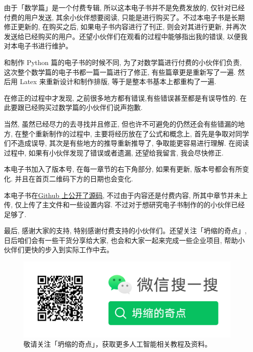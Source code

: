 由于「数学篇」是一个付费专辑, 所以这本电子书并不是免费发放的, 仅针对已经付费的用户发送, 其余小伙伴想要阅读, 只能是进行购买了。不过本电子书是长期修正更新的, 在购买之后, 如果电子书内容进行了刊正, 则会对其进行更新, 并再次发送给已经购买的用户。还望小伙伴们在观看的过程中能够指出我的错误, 以便我对本电子书进行维护。

和制作 Python 篇的电子书的时候不同, 为了对数学篇进行付费的小伙伴们负责, 这次整个数学篇的电子书都一篇一篇进行了修正, 有些篇章更是重新写了一遍. 然后用 Latex 来重新设计和制作排版, 等于是整本书基本上都重构了一遍.

在修正的过程中才发现, 之前很多地方都有错误,有些错误甚至都是有误导性的. 在此要跟已经购买过数学篇的小伙伴们说声抱歉. 

当然, 虽然已经尽力的去寻找并且修正, 但也许不可避免的仍然还会有些错漏的地方, 在整个重新制作的过程中, 主要将经历放在了公式和概念上, 首先是争取对同学们不造成误导, 其次是有些地方的推导重新推导了, 争取能更容易进行理解. 在阅读过程中, 如果有小伙伴发现了错误或者遗漏, 还望给我留言, 我会尽快修正.

本电子书加入了版本号, 在每一章节的右下角部分, 如果有更新, 版本号都会有所变化. 并且在首页二维码下方的日期也会变化.

本电子书在\href{https://github.com/hivandu/Ebook_AI_Math}{Github 上公开了源码}, 不过由于内容还是付费内容, 所其中章节并未上传, 仅上传了主文件和一些设置内容. 不过对于想研究电子书制作的的小伙伴已经足够了.

最后, 感谢大家的支持, 特别感谢付费支持的小伙伴们。还望关注「坍缩的奇点」, 日后咱们会有一些干货分享给大家, 也会和大家一起来完成一些企业项目, 帮助小伙伴们更快的步入到实际工作中去。

\begin{figure}[ht]
  \centering
  \includegraphics[width=0.6\linewidth]{asset/Capture-2023-11-02-164446.png}
  \caption{敬请关注「坍缩的奇点」，获取更多人工智能相关教程及资料。}
  \label{fig:img1_1}
\end{figure}